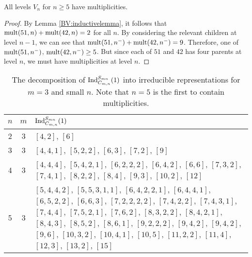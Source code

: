 \begin{theorem}\label{BV:multiplicities}
All levels $V_n$ for $n \ge 5$ have multiplicities.
\end{theorem}
\begin{proof}
By Lemma \ref{BV:inductivelemma}, it follows that $\textup{mult}(51,n) + \textup{mult}(42,n) = 2$ for all $n$.
By considering the relevant children at level $n-1$, we can see that $\textup{mult}(51,n^-) + \textup{mult}(42,n^-) = 9$.
 Therefore, one of
$\textup{mult}(51,n^-)$, $\textup{mult}(42,n^-) \ge 5$. But since each of $51$ and $42$ has four parents at
level $n$, we must have multiplicities at level $n$.
\end{proof}

\begin{table}[h]
\caption{The decomposition of $\textup{Ind}_{C_{m,n}}^{S_{mn}}(1)$ into irreducible representations for $m=3$ and small $n$. Note that $n=5$ is the first to contain multiplicities.}
\begin{center} 
    \begin{tabular}{|c|c|p{12cm}|}
    \hline
    $n$ & $m$ & $\textup{Ind}_{C_{m,n}}^{S_{mn}}(1)$ \\ \hline
    2 & 3 & $[4, 2]$, $[6]$ \\ \hline
    3 & 3 & $[4, 4, 1]$, $[5, 2, 2]$, $[6, 3]$, $[7, 2]$, $[9]$  \\ \hline
    4 & 3 & $[4, 4, 4]$, $[5, 4, 2, 1]$, $[6, 2, 2, 2]$, $[6, 4, 2]$, $[6, 6]$, $[7, 3, 2]$, $[7, 4, 1]$, $[8, 2, 2]$, $[8, 4]$, $[9, 3]$, $[10, 2]$, $[12]$ \\ \hline
    5 & 3 & $[5, 4, 4, 2]$, $[5, 5, 3, 1, 1]$, $[6, 4, 2, 2, 1]$, $[6, 4, 4, 1]$, $[6, 5, 2, 2]$, $[6, 6, 3]$, $[7, 2, 2, 2, 2]$, $[7, 4, 2, 2]$, $[7, 4, 3, 1]$, $[7, 4, 4]$, $[7, 5, 2, 1]$, $[7, 6, 2]$, $[8, 3, 2, 2]$, $[8, 4, 2, 1]$, $[8, 4, 3]$, $[8, 5, 2]$, $[8, 6, 1]$, $[9, 2, 2, 2]$, $[9, 4, 2]$, $[9, 4, 2]$, $[9, 6]$, $[10, 3, 2]$, $[10, 4, 1]$, $[10, 5]$, $[11, 2, 2]$, $[11, 4]$, $[12, 3]$, $[13, 2]$, $[15]$ \\ \hline
    \end{tabular}
\label{BV:table1}
\end{center}
\end{table}